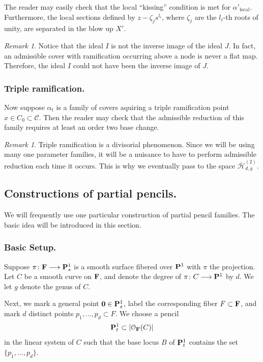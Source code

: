 \documentclass[reqno, 10 pt]{article}
\theoremstyle{definition}
\theoremstyle{remark}
\newtheorem{rmk}[thm]{Remark}
\numberwithin{equation}{section}
\numberwithin{thm}{section}
\numberwithin{prop}{section}
\numberwithin{lem}{section}
\numberwithin{cor}{section}
\numberwithin{conj}{section}
\numberwithin{defn}{section}
\renewcommand{\H}{\mathcal H}
\newcommand{\F}{{\mathbf F}}
\newcommand{\Hdgnt}{\overline{\H}_{d,g}^{(2)}}
\renewcommand{\to}{\longrightarrow}
\newcommand{\cC}{{\mathcal C}}
\newcommand{\cO}{{\mathcal O}}
\renewcommand{\P}{{\bf P}}
\renewcommand{\F}{{\bf F}}
\newcommand {\from}{{\colon}}
\renewcommand{\H}{{\mathcal{H}}}
\begin{document}
    The reader may easily check that the local ``kissing'' condition is met for $\alpha'_{\text{local}}$.  Furthermore, the local sections defined by $z - \zeta_{j}s^{l_{i}}$, where $\zeta_{j}$ are the ${l_{i}}$-th roots of unity, are separated in the blow up $X'$. 

    \begin{rmk}
    Notice that the ideal $I$ is not the inverse image of the ideal $J$.  In fact, an admissible cover with ramification occurring above a node is never a flat map.  Therefore, the ideal $I$ could not have been the inverse image of $J$. 
    \end{rmk}

  \subsubsection{Triple ramification.} 
    Now suppose $\alpha_{t}$ is a family of covers aquiring a triple ramification point $x \in C_{0} \subset \cC$. Then the reader may check that the admissible reduction of this family requires at least an order two base change.  

     \begin{rmk}
    Triple ramification is a divisorial phenomenon. Since we will be using many one parameter families, it will be a nuisance to have to perform admissible reduction each time it occurs.  This is why we eventually pass to the space $\Hdgnt$.
    \end{rmk}


\subsection{Constructions of partial pencils.} \label{construction} 
  We will frequently use one particular construction of partial pencil families. The basic idea will be introduced in this section.
 
  \subsubsection{Basic Setup.}  
    Suppose $\pi \from \F \to \P^1_{s}$ is a smooth surface fibered over $\P^1$ with $\pi$ the projection.  Let $C$ be a smooth curve on $\F$, and denote the degree of $\pi \from C \to \P^1$ by $d$.  We let $g$ denote the genus of $C$. 
 
    Next, we mark a general point ${\bf 0} \in \P^1_{s}$, label the corresponding fiber $F \subset \F$, and mark $d$ distinct points $p_{1}, ... ,p_{d} \subset F$.   We choose a pencil \[\P^1_{t} \subset |\cO_{\F}(C)|\] in the linear system of $C$ such that  the base locus $B$ of $\P^{1}_{t}$ contains the set $\{p_{1},...,p_{d}\}$.  
\end{document}
